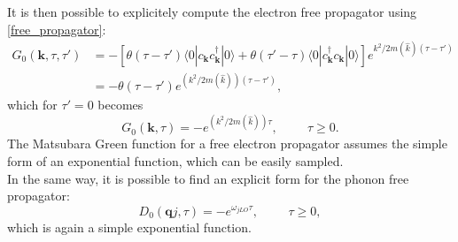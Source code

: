 \documentclass[12pt, a4paper]{report}
\numberwithin{equation}{section}
\begin{document}
It is then possible to explicitely compute the electron free propagator using \ref{free_propagator}:
\begin{equation}
\begin{split}
    G_0(\mathbf{k},\tau,\tau')&=-\left[\theta(\tau-\tau')\langle 0| c_\mathbf{k}c^\dagger_\mathbf{k}|0\rangle+\theta(\tau'-\tau)\langle 0 | c^\dagger_\mathbf{k}c_\mathbf{k}|0\rangle\right]e^{k^2/2m(\hat{k})(\tau-\tau')}\\
    &=-\theta(\tau-\tau')e^{(k^2/2m(\hat{k}))(\tau-\tau')},
\end{split}
\end{equation}
which for $\tau'=0$ becomes
\begin{equation}
    G_0(\mathbf{k},\tau)=-e^{(k^2/2m(\hat{k}))\tau},\hspace{1cm}\tau\ge0.
\end{equation}
The Matsubara Green function for a free electron propagator assumes the simple form of an exponential function, which can be easily sampled.\\
In the same way, it is possible to find an explicit form for the phonon free propagator:
\begin{equation}
    D_0(\mathbf{q}j,\tau)=-e^{\omega_{jLO}\tau},\hspace{1cm}\tau\ge0,
\end{equation}
which is again a simple exponential function.
\printbibliography
\end{document}
